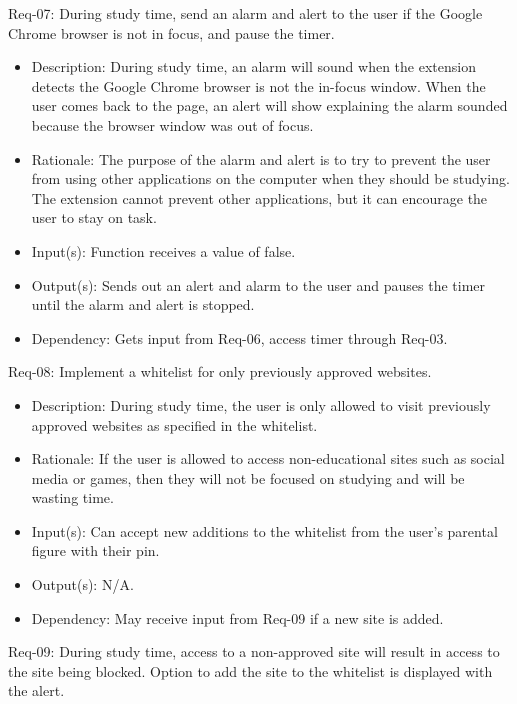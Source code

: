 \documentclass[12pt]{article}
\begin{document}
Req-07: During study time, send an alarm and alert to the user if the Google Chrome browser is not in focus, and pause the timer.
\begin{itemize}
    \item Description: During study time, an alarm will sound when the extension detects the Google Chrome browser is not the in-focus window. When the user comes back to the page, an alert will show explaining the alarm sounded because the browser window was out of focus.
    \item Rationale: The purpose of the alarm and alert is to try to prevent the user from using other applications on the computer when they should be studying. The extension cannot prevent other applications, but it can encourage the user to stay on task.
    \item Input(s): Function receives a value of false.
    \item Output(s): Sends out an alert and alarm to the user and pauses the timer until the alarm and alert is stopped.
    \item Dependency: Gets input from Req-06, access timer through Req-03.
\end{itemize}
Req-08: Implement a whitelist for only previously approved websites.
\begin{itemize}
    \item Description: During study time, the user is only allowed to visit previously approved websites as specified in the whitelist.
    \item Rationale: If the user is allowed to access non-educational sites such as social media or games, then they will not be focused on studying and will be wasting time.
    \item Input(s): Can accept new additions to the whitelist from the user’s parental figure with their pin.
    \item Output(s): N/A.
    \item Dependency: May receive input from Req-09 if a new site is added.
\end{itemize}
Req-09: During study time, access to a non-approved site will result in access to the site being blocked. Option to add the site to the whitelist is displayed with the alert.
\end{document}
